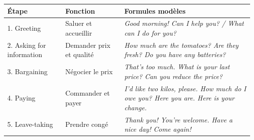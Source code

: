 \documentclass[11pt]{article}
\newcommand{\eng}[1]{\ifmmode\text{\textit{#1}}\else\begingroup\selectlanguage{english}\itshape #1\endgroup\fi}
\begin{document}
\begin{center}
\begin{tabularx}{\linewidth}{|l|X|X|}
\hline
\rowcolor{popblueL} \textbf{Étape} & \textbf{Fonction} & \textbf{Formules modèles} \\
\hline
1. Greeting & Saluer et accueillir & \eng{Good morning! Can I help you? / What can I do for you?} \\
\hline
2. Asking for information & Demander prix et qualité & \eng{How much are the tomatoes? Are they fresh? Do you have any batteries?} \\
\hline
3. Bargaining & Négocier le prix & \eng{That's too much. What is your last price? Can you reduce the price?} \\
\hline
4. Paying & Commander et payer & \eng{I'd like two kilos, please. How much do I owe you? Here you are. Here is your change.} \\
\hline
5. Leave-taking & Prendre congé & \eng{Thank you! You're welcome. Have a nice day! Come again!} \\
\hline
\end{tabularx}
\end{center}
\end{document}
